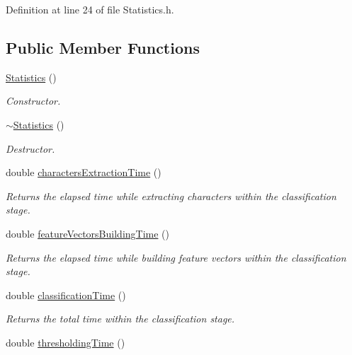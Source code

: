 Definition at line 24 of file Statistics.h.\subsection*{Public Member Functions}
\begin{CompactItemize}
\item 
\hyperlink{class_statistics_60ddd90a571ed4c3ce8c0f6317a36d63}{Statistics} ()
\begin{CompactList}\small\item\em Constructor. \item\end{CompactList}\item 
\hypertarget{class_statistics_b68ede75479e44d5c35b78ec1284065b}{
\hyperlink{class_statistics_b68ede75479e44d5c35b78ec1284065b}{$\sim$Statistics} ()}
\label{class_statistics_b68ede75479e44d5c35b78ec1284065b}

\begin{CompactList}\small\item\em Destructor. \item\end{CompactList}\item 
\hypertarget{class_statistics_8ec785f780c94502dd4c7e8602cf101e}{
double \hyperlink{class_statistics_8ec785f780c94502dd4c7e8602cf101e}{charactersExtractionTime} ()}
\label{class_statistics_8ec785f780c94502dd4c7e8602cf101e}

\begin{CompactList}\small\item\em Returns the elapsed time while extracting characters within the classification stage. \item\end{CompactList}\item 
\hypertarget{class_statistics_d32e65b956d2d2038d07c2e8c9e58cde}{
double \hyperlink{class_statistics_d32e65b956d2d2038d07c2e8c9e58cde}{featureVectorsBuildingTime} ()}
\label{class_statistics_d32e65b956d2d2038d07c2e8c9e58cde}

\begin{CompactList}\small\item\em Returns the elapsed time while building feature vectors within the classification stage. \item\end{CompactList}\item 
double \hyperlink{class_statistics_5ed76fbaac7463ebe6ba9f240b33c0eb}{classificationTime} ()
\begin{CompactList}\small\item\em Returns the total time within the classification stage. \item\end{CompactList}\item 
\hypertarget{class_statistics_0e0d7fca93f47af687cbd93e286ec274}{
double \hyperlink{class_statistics_0e0d7fca93f47af687cbd93e286ec274}{thresholdingTime} ()}
\label{class_statistics_0e0d7fca93f47af687cbd93e286ec274}


\end{CompactItemize}
